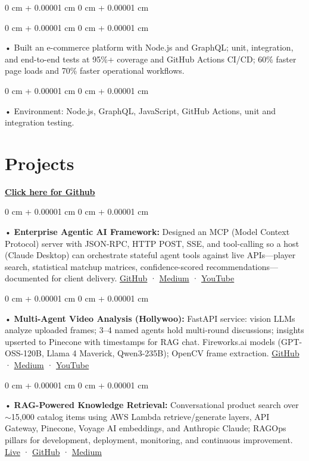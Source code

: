 \documentclass[10pt, letterpaper]{article}
\newenvironment{onecolentry}{
    \begin{adjustwidth}{
        0 cm + 0.00001 cm
    }{
        0 cm + 0.00001 cm
    }
}{
    \end{adjustwidth}
} %
\begin{document}
\begin{onecolentry}
        \begin{onecolentry}
             • Built an e-commerce platform with Node.js and GraphQL; unit, integration, and end-to-end tests at 95\%+ coverage and GitHub Actions CI/CD; 60\% faster page loads and 70\% faster operational workflows.
        \end{onecolentry}
        \begin{onecolentry}
             • Environment: Node.js, GraphQL, JavaScript, GitHub Actions, unit and integration testing.
        \end{onecolentry}
             \vspace{2 pt }

        \vspace{0.2cm}
\section{Projects}
    \vspace{2 pt}
\end{onecolentry}
\textbf{\href{https://github.com/daedalus-s}{Click here for Github}}
\begin{onecolentry}
     • \textbf{Enterprise Agentic AI Framework:} Designed an MCP (Model Context Protocol) server with JSON-RPC, HTTP POST, SSE, and tool-calling so a host (Claude Desktop) can orchestrate stateful agent tools against live APIs---player search, statistical matchup matrices, confidence-scored recommendations---documented for client delivery. \href{https://github.com/daedalus-s/dota2-mcp-server}{GitHub} · \href{https://medium.com/@sreenikethaathreya/get-good-at-using-ai-noob-5d2576203112}{Medium} · \href{https://www.youtube.com/watch?v=op2gTYyFb5U}{YouTube}
\end{onecolentry}
\begin{onecolentry}
     • \textbf{Multi-Agent Video Analysis (Hollywoo):} FastAPI service: vision LLMs analyze uploaded frames; 3--4 named agents hold multi-round discussions; insights upserted to Pinecone with timestamps for RAG chat. Fireworks.ai models (GPT-OSS-120B, Llama 4 Maverick, Qwen3-235B); OpenCV frame extraction. \href{https://github.com/daedalus-s/fireworks-video-discussion}{GitHub} · \href{https://medium.com/@sreenikethaathreya/hollywoo-ai-video-analysis-5eae37ca7e16}{Medium} · \href{https://www.youtube.com/watch?v=KBs_3V0OAgU}{YouTube}
\end{onecolentry}
\begin{onecolentry}
     • \textbf{RAG-Powered Knowledge Retrieval:} Conversational product search over $\sim$15,000 catalog items using AWS Lambda retrieve/generate layers, API Gateway, Pinecone, Voyage AI embeddings, and Anthropic Claude; RAGOps pillars for development, deployment, monitoring, and continuous improvement. \href{https://prorecsa.co}{Live} · \href{https://github.com/daedalus-s/ragops-doc}{GitHub} · \href{https://medium.com/@sreenikethaathreya/from-rags-to-riches-bba8a671d5e6}{Medium}
\end{onecolentry}
\end{document}
